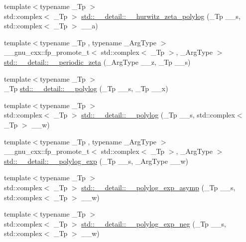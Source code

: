 \begin{DoxyCompactItemize}
\item 
{\footnotesize template$<$typename \+\_\+\+Tp $>$ }\\std\+::complex$<$ \+\_\+\+Tp $>$ \hyperlink{namespacestd_1_1____detail_a7c45415c3ec0e137eea2364a6dd3af4e}{std\+::\+\_\+\+\_\+detail\+::\+\_\+\+\_\+hurwitz\+\_\+zeta\+\_\+polylog} (\+\_\+\+Tp \+\_\+\+\_\+s, std\+::complex$<$ \+\_\+\+Tp $>$ \+\_\+\+\_\+a)
\item 
{\footnotesize template$<$typename \+\_\+\+Tp , typename \+\_\+\+Arg\+Type $>$ }\\\+\_\+\+\_\+gnu\+\_\+cxx\+::fp\+\_\+promote\+\_\+t$<$ std\+::complex$<$ \+\_\+\+Tp $>$, \+\_\+\+Arg\+Type $>$ \hyperlink{namespacestd_1_1____detail_a1d65d34f43558441e4ed83d84dbc9ddf}{std\+::\+\_\+\+\_\+detail\+::\+\_\+\+\_\+periodic\+\_\+zeta} (\+\_\+\+Arg\+Type \+\_\+\+\_\+z, \+\_\+\+Tp \+\_\+\+\_\+s)
\item 
{\footnotesize template$<$typename \+\_\+\+Tp $>$ }\\\+\_\+\+Tp \hyperlink{namespacestd_1_1____detail_a17fb8cea11706f319aaea277188a29c8}{std\+::\+\_\+\+\_\+detail\+::\+\_\+\+\_\+polylog} (\+\_\+\+Tp \+\_\+\+\_\+s, \+\_\+\+Tp \+\_\+\+\_\+x)
\item 
{\footnotesize template$<$typename \+\_\+\+Tp $>$ }\\std\+::complex$<$ \+\_\+\+Tp $>$ \hyperlink{namespacestd_1_1____detail_aa14e3ca6e4bee5ac1f1e5e1c2cee1d5a}{std\+::\+\_\+\+\_\+detail\+::\+\_\+\+\_\+polylog} (\+\_\+\+Tp \+\_\+\+\_\+s, std\+::complex$<$ \+\_\+\+Tp $>$ \+\_\+\+\_\+w)
\item 
{\footnotesize template$<$typename \+\_\+\+Tp , typename \+\_\+\+Arg\+Type $>$ }\\\+\_\+\+\_\+gnu\+\_\+cxx\+::fp\+\_\+promote\+\_\+t$<$ std\+::complex$<$ \+\_\+\+Tp $>$, \+\_\+\+Arg\+Type $>$ \hyperlink{namespacestd_1_1____detail_a0f6f2fc92d4ccec43975a6b9aca9851a}{std\+::\+\_\+\+\_\+detail\+::\+\_\+\+\_\+polylog\+\_\+exp} (\+\_\+\+Tp \+\_\+\+\_\+s, \+\_\+\+Arg\+Type \+\_\+\+\_\+w)
\item 
{\footnotesize template$<$typename \+\_\+\+Tp $>$ }\\std\+::complex$<$ \+\_\+\+Tp $>$ \hyperlink{namespacestd_1_1____detail_af3684fc449da490e9a43985245618a90}{std\+::\+\_\+\+\_\+detail\+::\+\_\+\+\_\+polylog\+\_\+exp\+\_\+asymp} (\+\_\+\+Tp \+\_\+\+\_\+s, std\+::complex$<$ \+\_\+\+Tp $>$ \+\_\+\+\_\+w)
\item 
{\footnotesize template$<$typename \+\_\+\+Tp $>$ }\\std\+::complex$<$ \+\_\+\+Tp $>$ \hyperlink{namespacestd_1_1____detail_a07b26b8c7ff467310e4e1df6e3efd893}{std\+::\+\_\+\+\_\+detail\+::\+\_\+\+\_\+polylog\+\_\+exp\+\_\+neg} (\+\_\+\+Tp \+\_\+\+\_\+s, std\+::complex$<$ \+\_\+\+Tp $>$ \+\_\+\+\_\+w)

\end{DoxyCompactItemize}
